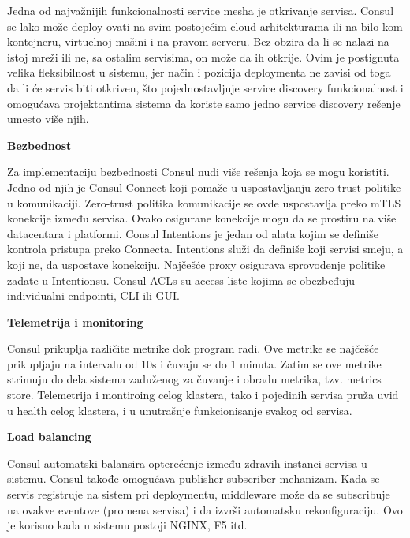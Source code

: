 \documentclass[a4paper,12pt]{report}
\begin{document}
Jedna od najvažnijih funkcionalnosti service mesha je otkrivanje servisa. Consul se lako može deploy-ovati na svim postojećim cloud arhitekturama ili na bilo kom kontejneru, virtuelnoj mašini i na pravom serveru. Bez obzira da li se nalazi na istoj mreži ili ne, sa ostalim servisima, on može da ih otkrije. Ovim je postignuta velika fleksibilnost u sistemu, jer način i pozicija deploymenta ne zavisi od toga da li će servis biti otkriven, što pojednostavljuje service discovery funkcionalnost i omogućava projektantima sistema da koriste samo jedno service discovery rešenje umesto više njih. \newline

\textbf{Bezbednost}\newline

Za implementaciju bezbednosti Consul nudi više rešenja koja se mogu koristiti. Jedno od njih je Consul Connect koji pomaže u uspostavljanju zero-trust politike u komunikaciji. Zero-trust politika komunikacije se ovde uspostavlja preko mTLS konekcije između servisa. Ovako osigurane konekcije mogu da se prostiru na više datacentara i platformi. Consul Intentions je jedan od alata kojim se definiše 	kontrola pristupa preko Connecta. Intentions služi da definiše koji servisi smeju, a koji ne, da uspostave konekciju. Najčešće proxy osigurava sprovođenje politike zadate u Intentionsu. Consul ACLs su access liste kojima se obezbeđuju individualni endpointi, CLI ili GUI.  \newline

\textbf{Telemetrija i monitoring}\newline

Consul prikuplja različite metrike dok program radi. Ove metrike se najčešće prikupljaju na intervalu od 10s i čuvaju se do 1 minuta. Zatim se ove metrike strimuju do dela sistema zaduženog za čuvanje i obradu metrika, tzv. metrics store. Telemetrija i montiroing celog klastera, tako i pojedinih servisa pruža uvid u health celog klastera, i u unutrašnje funkcionisanje svakog od servisa.  \newline

\textbf{Load balancing}\newline

Consul automatski balansira opterećenje između zdravih instanci servisa u sistemu. Consul takođe omogućava publisher-subscriber mehanizam. Kada se servis registruje na sistem pri deploymentu, middleware može da se subscribuje na ovakve eventove (promena servisa) i da izvrši automatsku rekonfiguraciju. Ovo je korisno kada u sistemu postoji NGINX, F5 itd. \newline
\end{document}
